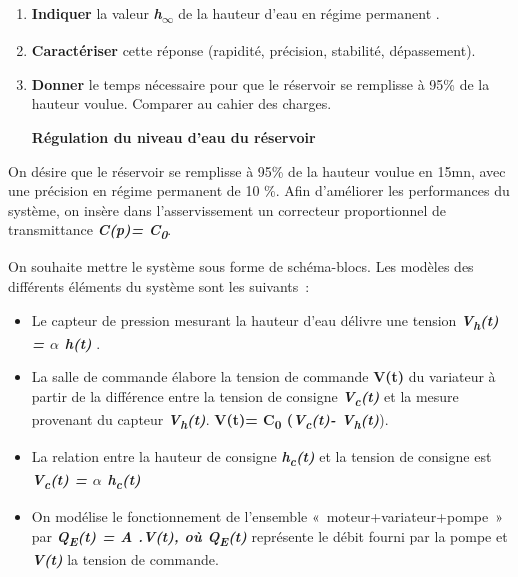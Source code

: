 \begin{enumerate}
\def\labelenumi{\arabic{enumi}.}
\item
  \textbf{Indiquer} la valeur \emph{\textbf{h\textsubscript{$\infty$}}} de la
  hauteur d'eau en régime permanent .
\item
  \textbf{Caractériser} cette réponse (rapidité, précision, stabilité,
  dépassement).
\item
  \textbf{Donner} le temps nécessaire pour que le réservoir se remplisse
  à 95\% de la hauteur voulue. Comparer au cahier des charges.

  \textbf{Régulation du niveau d'eau du réservoir}
\end{enumerate}

On désire que le réservoir se remplisse à 95\% de la hauteur voulue en
15mn, avec une précision en régime permanent de 10 \%. Afin d'améliorer
les performances du système, on insère dans l'asservissement un
correcteur proportionnel de transmittance \emph{\textbf{C(p)=
C\textsubscript{0}}}.

On souhaite mettre le système sous forme de schéma-blocs. Les modèles
des différents éléments du système sont les suivants~:

\begin{itemize}
\item
  Le capteur de pression mesurant la hauteur d'eau délivre une tension
  \emph{\textbf{V\textsubscript{h}(t) = $\alpha$ h(t)}} .
\end{itemize}

\begin{itemize}
\item
  La salle de commande élabore la tension de commande \textbf{V(t)} du
  variateur à partir de la différence entre la tension de consigne
  \emph{\textbf{V\textsubscript{c}(t)}} et la mesure provenant du
  capteur \emph{\textbf{V\textsubscript{h}(t)}}. \textbf{V(t)=
  C\textsubscript{0} (\emph{V\textsubscript{c}(t)-
  V\textsubscript{h}(t)}}).
\end{itemize}

\begin{itemize}
\item
  La relation entre la hauteur de consigne
  \emph{\textbf{h\textsubscript{c}(t)}} et la tension de consigne est
  \emph{\textbf{V\textsubscript{c}(t) = $\alpha$ h\textsubscript{c}(t)}}
\end{itemize}

\begin{itemize}
\item
  On modélise le fonctionnement de l'ensemble «~moteur+variateur+pompe~»
  par \emph{\textbf{Q\textsubscript{E}(t) = A .V(t), où
  Q\textsubscript{E}(t)}} représente le débit fourni par la pompe et
  \emph{\textbf{V(t)}} la tension de commande.
\end{itemize}

